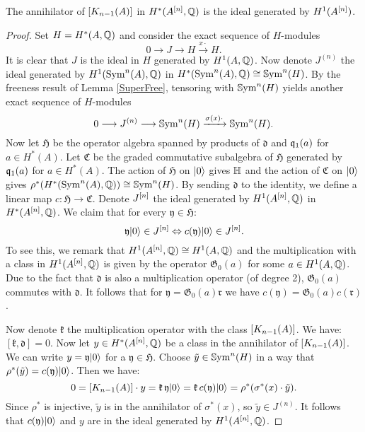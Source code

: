 \begin{proposition}
The annihilator of $[\kum{A}{n-1}]$ in $H^*(A\hilb{n},\Q)$ is the ideal generated by $H^1(A\hilb{n})$. 
\end{proposition}
\begin{proof}
Set $H=H^*(A,\Q)$ and consider the exact sequence of $H$-modules
$$
0 \longrightarrow 
J
\longrightarrow H \stackrel{x\cdot}{\longrightarrow} H.
$$
It is clear that $J$ is the ideal in $H$ generated by $H^{1}(A,\Q)$. 
Now denote $J^{(n)}$ the ideal generated by $H^1(\Sym^n(A),\Q)$ in $H^*(\Sym^n(A),\Q)\cong\SSym^n(H)$.
By the freeness result of Lemma \ref{SuperFree}, tensoring with $\SSym^n(H)$ yields another exact sequence of $H$-modules
$$
0 \longrightarrow {J}^{(n)} \longrightarrow \SSym^n(H) \xrightarrow{\sigma(x)\cdot} \SSym^n(H).
$$
Now let $\mathfrak{H}$ be the operator algebra spanned by products of $\mathfrak d$ and $\q_1(a)$ for $a\in H^*(A)$. Let $\mathfrak C$ be the graded commutative subalgebra of $\mathfrak H$ generated by $\q_1(a)$ for $a\in H^*(A)$. The action of $\mathfrak H$ on $\vac$ gives $\H$ and the action of $\mathfrak C$ on $\vac$ gives $\rho^*(H^*(\Sym^n(A),\Q))\cong \SSym^n(H)$.
By sending $\mathfrak d$ to the identity, we define a linear map $c : \mathfrak H \rightarrow \mathfrak C$. 
Denote $J\hilb{n}$ the ideal generated by $H^1(A\hilb{n},\Q)$ in $H^*(A \hilb n,\Q)$. We claim that for every $\mathfrak y\in \mathfrak H$:
$$
\mathfrak y\vac \in J\hilb{n} \Leftrightarrow c(\mathfrak y)\vac \in J\hilb{n}.
$$
To see this, we remark that $H^1(A \hilb n,\Q) \cong H^1(A ,\Q)  $ and the multiplication with a class in $H^1(A \hilb n,\Q) $ is given by the operator $\mathfrak G_0(a)$ for some $a\in H^1(A ,\Q)$. Due to the fact that $\mathfrak d$ is also a multiplication operator (of degree 2), $\mathfrak G_0(a)$ commutes with $\mathfrak d$. It follows that for $\mathfrak y =\mathfrak G_0(a) \mathfrak r$ we have $c(\mathfrak y) = \mathfrak G_0(a) c(\mathfrak r)$.

Now denote $\mathfrak k$ the multiplication operator with the class $[\kum{A}{n-1}]$. We have:
$
[\mathfrak k, \mathfrak d] = 0.
$
Now let $y\in H^*(A\hilb{n},\Q)$ be a class in the annihilator of $[\kum{A}{n-1}]$. We can write $y= \mathfrak y\vac$ for a $\mathfrak y\in\mathfrak H$. Choose $\tilde y \in \SSym^n (H)$ in a way that $\rho^*(\tilde y) = c(\mathfrak y) \vac$. Then we have:
$$
0=[\kum{A}{n-1}]\cdot y = \mathfrak k\, \mathfrak y \vac =  \mathfrak k \,c(\mathfrak y)\vac = \rho^*(\sigma^*(x) \cdot \tilde y).
$$
Since $\rho^*$ is injective, $\tilde y$ is in the annihilator of $\sigma^*(x)$, so $\tilde y \in J^{(n)}$. It follows that $c(\mathfrak y)\vac$ and $y$ are in the ideal generated by $H^1(A\hilb{n},\Q)$.
\end{proof}

